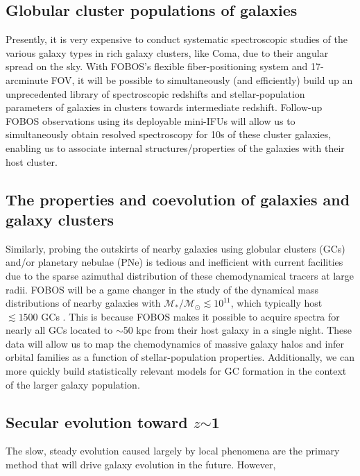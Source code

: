 
\subsection{Globular cluster populations of galaxies}

Presently, it is very expensive to conduct systematic spectroscopic
studies of the various galaxy types in rich galaxy clusters, like
Coma, due to their angular spread on the sky. With FOBOS's flexible
fiber-positioning system and 17-arcminute FOV, it will be possible to
simultaneously (and efficiently) build up an unprecedented library of
spectroscopic redshifts and stellar-population parameters of galaxies
in clusters towards intermediate redshift. Follow-up FOBOS
observations using its deployable mini-IFUs will allow us to
simultaneously obtain resolved spectroscopy for 10s of these cluster
galaxies, enabling us to associate internal structures/properties of
the galaxies with their host cluster.

\subsection{The properties and coevolution of galaxies and galaxy clusters}

Similarly, probing the outskirts of nearby galaxies using globular
clusters (GCs) and/or planetary nebulae (PNe) is tedious and
inefficient with current facilities due to the sparse azimuthal
distribution of these chemodynamical tracers at large radii. FOBOS
will be a game changer in the study of the dynamical mass
distributions of nearby galaxies with $\mathcal{M_\ast/M_\odot}
\lesssim 10^{11}$, which typically host $\lesssim1500$ GCs
\citep{2013ApJ...772...82H}. This is because FOBOS makes it possible
to acquire spectra for nearly all GCs located to $\sim$50 kpc from
their host galaxy in a single night. These data will allow us to map
the chemodynamics of massive galaxy halos and infer orbital families
as a function of stellar-population properties. Additionally, we can
more quickly build statistically relevant models for GC formation in
the context of the larger galaxy population.

\subsection{Secular evolution toward $z$$\sim$1}

The slow, steady evolution caused largely by local phenomena are the
primary method that will drive galaxy evolution in the future.  However, 

